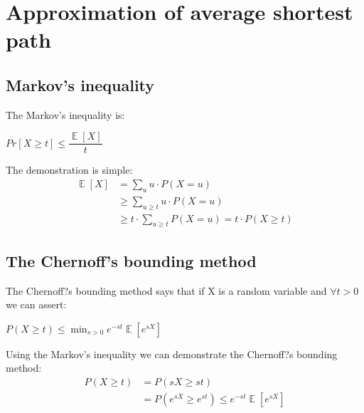\documentclass[10pt,a4paper]{book}
\DeclareMathOperator{\E}{\mathbb{E}}
\begin{document}
	\section{Approximation of average shortest path}
	\subsection{Markov's inequality}
	The Markov's inequality is:
	\begin{center}
	$ Pr \left[ X \geq t \right] \leq \dfrac{\E\left[ X \right]}{t}$
	\end{center}
	The demonstration is simple:
	\begin{align*}
		 \E[X] &= \sum_u u \cdot P(X = u) \\
		 & \geq \sum_{u \geq t} u \cdot P(X = u)  \\
		  &\geq t \cdot \sum_{u \geq t}  P(X = u) = t\cdot P(X \geq t)  
	\end{align*}
	\subsection{The Chernoff's bounding method}
	 The Chernoff?s bounding method says that if X is a random variable and $ \forall t > 0 $ we can assert:
		\begin{center}
			$ P(X \geq t) \leq \min_{s > 0} e^{-st} \E\left[ e^{sX} \right]$
		\end{center}
		Using the Markov's inequality we can demonstrate the Chernoff?s bounding method:
		\begin{align*}
			P(X \geq t) &= P(sX \geq st)  \\
			&= P(e^{sX}\geq e^{st}) \leq e^{-st} \E \left[ e^{sX} \right]
		\end{align*}
\end{document}
